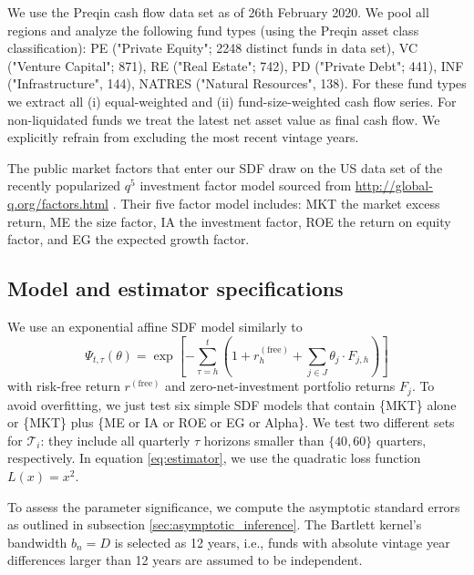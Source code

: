 \documentclass[12pt]{article}
\begin{document}
We use the Preqin cash flow data set as of 26th February 2020.
We pool all regions and analyze the following fund types (using the Preqin asset class classification):
PE ("Private Equity"; 2248 distinct funds in data set),
VC ("Venture Capital"; 871),
RE ("Real Estate"; 742),
PD ("Private Debt"; 441),
INF ("Infrastructure", 144), 
NATRES ("Natural Resources", 138).
For these fund types we extract all (i) equal-weighted and (ii) fund-size-weighted cash flow series.
For non-liquidated funds we treat the latest net asset value as final cash flow.
We explicitly refrain from excluding the most recent vintage years.

The public market factors that enter our SDF draw on the US data set of the recently popularized $q^5$ investment factor model sourced from \url{http://global-q.org/factors.html} \citep{HXZ15,HXZ20}. 
Their five factor model includes: MKT the market excess return, ME the size factor, IA the investment factor, ROE the return on equity factor, and EG the expected growth factor.


\subsection{Model and estimator specifications}
\label{sec:model_selection}

We use an exponential affine SDF model similarly to \cite{KN16}
\begin{equation}
\label{eq:SDF}
\Psi_{t,\tau} (\theta) = 
\exp
\left[
-
\sum_{\tau=h}^{t} \left( 1 + r_h^{(\mathrm{free})} + \sum_{j \in J} \theta_{j} \cdot F_{j,h} \right)
\right]
\end{equation}
with risk-free return $r^{(\mathrm{free})}$ and zero-net-investment portfolio returns $F_j$.
To avoid overfitting, we just test six simple SDF models that contain \{MKT\} alone or \{MKT\} plus \{ME or IA or ROE or EG or Alpha\}.
We test two different sets for $\mathcal{T}_i$: they include all quarterly $\tau$ horizons smaller than $\{40, 60\}$ quarters, respectively.
In equation \ref{eq:estimator}, we use the quadratic loss function $L(x)=x^2$.

To assess the parameter significance, we compute the asymptotic standard errors as outlined in subsection \ref{sec:asymptotic_inference}.
The Bartlett kernel's bandwidth $b_n=D$ is selected as 12 years, i.e., funds with absolute vintage year differences larger than 12 years are assumed to be independent.
\end{document}

